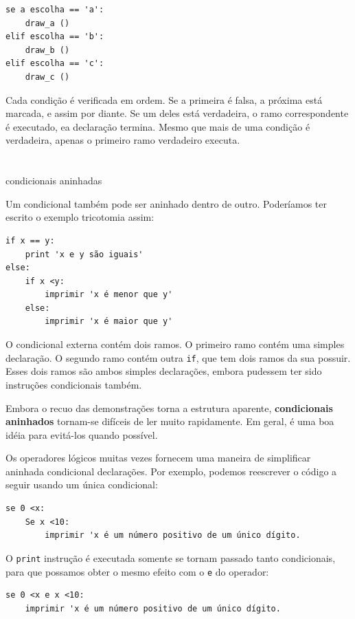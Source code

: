 \documentclass[10pt]{book}
\begin{document}
\begin{exercise}
{\begin{verbatim}
se a escolha == 'a':
    draw_a ()
elif escolha == 'b':
    draw_b ()
elif escolha == 'c':
    draw_c ()
\end{verbatim}
%
Cada condição é verificada em ordem. Se a primeira é falsa,
a próxima está marcada, e assim por diante. Se um deles está
verdadeira, o ramo correspondente é executado, ea declaração
termina. Mesmo que mais de uma condição é verdadeira, apenas o
primeiro ramo verdadeiro executa.  


\section{} condicionais aninhadas

Um condicional também pode ser aninhado dentro de outro. Poderíamos ter
escrito o exemplo tricotomia assim:

\begin{verbatim}
if x == y:
    print 'x e y são iguais'
else:
    if x <y:
        imprimir 'x é menor que y'
    else:
        imprimir 'x é maior que y'
\end{verbatim}
%
O condicional externa contém dois ramos. O
primeiro ramo contém uma simples declaração. O segundo ramo
contém outra {\tt if}, que tem dois ramos da sua
possuir. Esses dois ramos são ambos simples declarações,
embora pudessem ter sido instruções condicionais também.

Embora o recuo das demonstrações torna a estrutura
aparente, {\bf condicionais aninhados} tornam-se difíceis de ler muito
rapidamente. Em geral, é uma boa idéia para evitá-los quando possível.

Os operadores lógicos muitas vezes fornecem uma maneira de simplificar aninhada condicional
declarações. Por exemplo, podemos reescrever o código a seguir usando um
única condicional:

\begin{verbatim}
se 0 <x:
    Se x <10:
        imprimir 'x é um número positivo de um único dígito.
\end{verbatim}
%
O {\tt print} instrução é executada somente se tornam passado tanto
condicionais, para que possamos obter o mesmo efeito com o {\tt e} do operador:

\begin{verbatim}
se 0 <x e x <10:
    imprimir 'x é um número positivo de um único dígito.
\end{verbatim}


}
\end{exercise}
\end{document}
